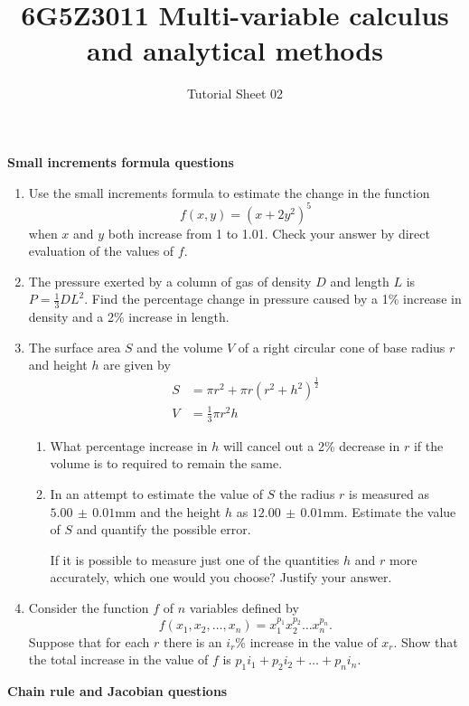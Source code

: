 \documentclass[a4paper]{amsart}
\begin{document}
\title{6G5Z3011 Multi-variable calculus and analytical methods}
\author{Tutorial Sheet 02}
\maketitle

\textbf{Small increments formula questions}
\begin{enumerate}

\item
Use the small increments formula to estimate the change in the function
$$f(x,y)=\left ( x+2y^2 \right )^5$$
when $x$ and $y$ both increase from 1 to 1.01. Check your answer by direct evaluation of the values of $f$.
\item
The pressure exerted by a column of gas of density $D$ and length $L$ is $P=\frac{1}{3} DL^2$. Find the percentage change in pressure caused by a 1\% increase in density and a 2\% increase in length.
\item
The surface area $S$ and the volume $V$ of a right circular cone of base radius $r$ and height $h$ are given by 
\begin{align*}
S&=\pi r^2 + \pi r \left ( r^2 + h^2 \right )^{\frac{1}{2}} \\
V&=\frac{1}{3} \pi r^2 h
\end{align*}
\begin{enumerate}
\item
What percentage increase in $h$ will cancel out a 2\% decrease in $r$ if the volume is to required to remain the same. 
\item
In an attempt to estimate the value of $S$ the radius $r$ is measured as $5.00 \, \pm \, 0.01 \text{mm}$ and the height $h$ as  $12.00 \, \pm \, 0.01 \text{mm}$. Estimate the value of $S$ and quantify the possible error.

If it is possible to measure just one of the quantities $h$ and $r$ more accurately, which one would you choose? Justify your answer.
\end{enumerate}
\item
Consider the function $f$ of $n$ variables defined by
$$f(x_1,x_2, \dots , x_n) = x_1^{p_1} x_2^{p_2} \dots x_n^{p_n} .$$
Suppose that for each $r$ there is an $i_r$\% increase in the value of $x_r$. Show that the total increase in the value of $f$ is $p_1 i_1 + p_2 i_2 + \dots + p_n i_n$.

\end{enumerate}
\textbf{Chain rule and Jacobian questions}
\end{document}
